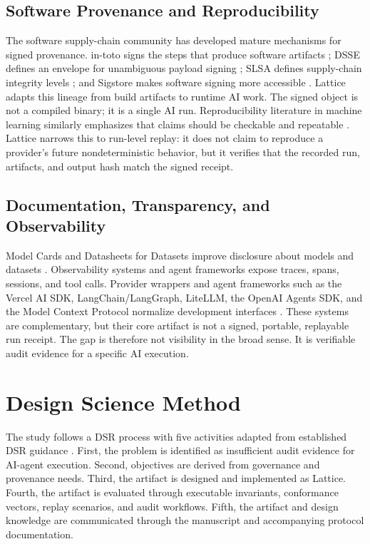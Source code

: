 \documentclass[conference]{IEEEtran}
\begin{document}
\subsection{Software Provenance and Reproducibility}

The software supply-chain community has developed mature mechanisms for signed
provenance. in-toto signs the steps that produce software artifacts
\cite{intoto}; DSSE defines an envelope for unambiguous payload signing
\cite{dsse}; SLSA defines supply-chain integrity levels \cite{slsa}; and
Sigstore makes software signing more accessible \cite{sigstore}. Lattice
adapts this lineage from build artifacts to runtime AI work. The signed object
is not a compiled binary; it is a single AI run. Reproducibility literature in
machine learning similarly emphasizes that claims should be checkable and
repeatable \cite{reproml,sculley2015debt}. Lattice narrows this to run-level
replay: it does not claim to reproduce a provider's future nondeterministic
behavior, but it verifies that the recorded run, artifacts, and output hash
match the signed receipt.

\subsection{Documentation, Transparency, and Observability}

Model Cards and Datasheets for Datasets improve disclosure about models and
datasets \cite{modelcards,datasheets}. Observability systems and agent
frameworks expose traces, spans, sessions, and tool calls. Provider wrappers and
agent frameworks such as the Vercel AI SDK, LangChain/LangGraph, LiteLLM, the
OpenAI Agents SDK, and the Model Context Protocol normalize development
interfaces \cite{vercelaisdk,langchain,litellm,openaiagents,mcp}. These
systems are complementary, but their core artifact is not a signed, portable,
replayable run receipt. The gap is therefore not visibility in the broad sense.
It is verifiable audit evidence for a specific AI execution.

\section{Design Science Method}

The study follows a DSR process with five activities adapted from established
DSR guidance \cite{hevner2004dsr,peffers2007dsrm,gregor2013dsr}. First, the
problem is identified as insufficient audit evidence for AI-agent execution.
Second, objectives are derived from governance and provenance needs. Third, the
artifact is designed and implemented as Lattice. Fourth, the artifact is
evaluated through executable invariants, conformance vectors, replay scenarios,
and audit workflows. Fifth, the artifact and design knowledge are communicated
through the manuscript and accompanying protocol documentation.
\end{document}
